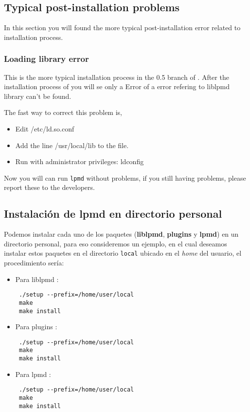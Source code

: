\subsection{Typical post-installation problems}

In this section you will found the more typical post-installation error related
to {\lpmd} installation process.

\subsubsection{Loading library error}

This is the more typical installation process in the 0.5 branch of {\lpmd}.
After the installation process of {\lpmd} you will se only a Error of a error
refering to liblpmd library can't be found.

The fast way to correct this problem is,

\begin{itemize}
 \item Edit /etc/ld.so.conf
 \item Add the line /usr/local/lib to the file.
 \item Run with administrator privileges: ldconfig
\end{itemize}

Now you will can run \verb|lpmd| without problems, if you still having
problems, please report these to the developers.

\subsection{Instalaci\'on de lpmd en directorio personal}
\label{subsub:personaldir}

Podemos instalar cada uno de los paquetes (\textbf{liblpmd}, \textbf{plugins} y \textbf{lpmd}) en un directorio personal, para eso consideremos un ejemplo, en el cual deseamos instalar estos paquetes en el directorio \verb|local| ubicado en el \textit{home} del usuario, el procedimiento ser\'ia:

\begin{itemize}
 \item Para liblpmd :
 \begin{verbatim}
 ./setup --prefix=/home/user/local
 make
 make install
 \end{verbatim}
 \item Para plugins :
 \begin{verbatim}
 ./setup --prefix=/home/user/local
 make
 make install
 \end{verbatim}
 \item Para lpmd :
 \begin{verbatim}
 ./setup --prefix=/home/user/local
 make
 make install
 \end{verbatim}
\end{itemize}

